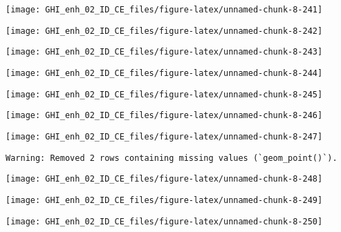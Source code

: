 \documentclass[
  10pt,
  a4paper,oneside]{article}
\begin{document}
\begin{center}\texttt{[image: GHI\_enh\_02\_ID\_CE\_files/figure-latex/unnamed-chunk-8-241]} \end{center}

\begin{center}\texttt{[image: GHI\_enh\_02\_ID\_CE\_files/figure-latex/unnamed-chunk-8-242]} \end{center}

\begin{center}\texttt{[image: GHI\_enh\_02\_ID\_CE\_files/figure-latex/unnamed-chunk-8-243]} \end{center}

\begin{center}\texttt{[image: GHI\_enh\_02\_ID\_CE\_files/figure-latex/unnamed-chunk-8-244]} \end{center}

\begin{center}\texttt{[image: GHI\_enh\_02\_ID\_CE\_files/figure-latex/unnamed-chunk-8-245]} \end{center}

\begin{center}\texttt{[image: GHI\_enh\_02\_ID\_CE\_files/figure-latex/unnamed-chunk-8-246]} \end{center}

\begin{center}\texttt{[image: GHI\_enh\_02\_ID\_CE\_files/figure-latex/unnamed-chunk-8-247]} \end{center}

\begin{verbatim}
Warning: Removed 2 rows containing missing values (`geom_point()`).
\end{verbatim}

\begin{center}\texttt{[image: GHI\_enh\_02\_ID\_CE\_files/figure-latex/unnamed-chunk-8-248]} \end{center}

\begin{center}\texttt{[image: GHI\_enh\_02\_ID\_CE\_files/figure-latex/unnamed-chunk-8-249]} \end{center}

\begin{center}\texttt{[image: GHI\_enh\_02\_ID\_CE\_files/figure-latex/unnamed-chunk-8-250]} \end{center}
\end{document}
